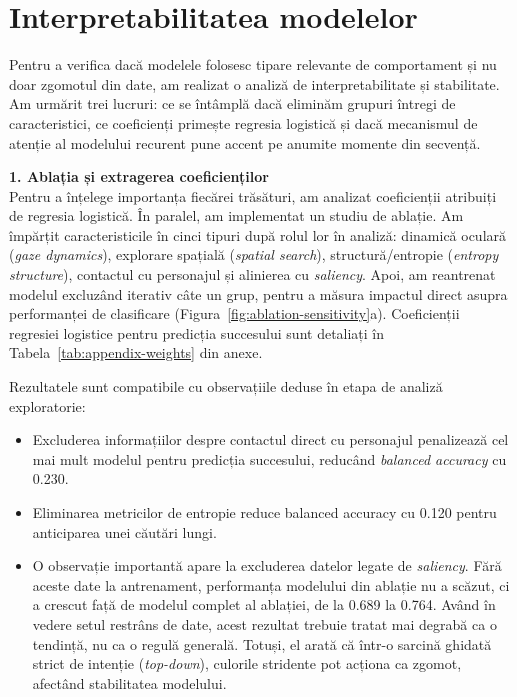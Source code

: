 \section{Interpretabilitatea modelelor}

Pentru a verifica dacă modelele folosesc tipare relevante de comportament și nu doar zgomotul din date, am realizat o analiză de interpretabilitate și stabilitate. Am urmărit trei lucruri: ce se întâmplă dacă eliminăm grupuri întregi de caracteristici, ce coeficienți primește regresia logistică și dacă mecanismul de atenție al modelului recurent pune accent pe anumite momente din secvență.

\textbf{1. Ablația și extragerea coeficienților} \\
Pentru a înțelege importanța fiecărei trăsături, am analizat coeficienții atribuiți de regresia logistică. În paralel, am implementat un studiu de ablație. Am împărțit caracteristicile în cinci tipuri după rolul lor în analiză: dinamică oculară (\emph{gaze dynamics}), explorare spațială (\emph{spatial search}), structură/entropie (\emph{entropy structure}), contactul cu personajul și alinierea cu \emph{saliency}. Apoi, am reantrenat modelul excluzând iterativ câte un grup, pentru a măsura impactul direct asupra performanței de clasificare (Figura~\ref{fig:ablation-sensitivity}a). Coeficienții regresiei logistice pentru predicția succesului sunt detaliați în Tabela~\ref{tab:appendix-weights} din anexe.

Rezultatele sunt compatibile cu observațiile deduse în etapa de analiză exploratorie:
\begin{itemize}
	\item Excluderea informațiilor despre contactul direct cu personajul penalizează cel mai mult modelul pentru predicția succesului, reducând \emph{balanced accuracy} cu 0.230.
	\item Eliminarea metricilor de entropie reduce balanced accuracy cu 0.120 pentru anticiparea unei căutări lungi.
	\item O observație importantă apare la excluderea datelor legate de \emph{saliency}. Fără aceste date la antrenament, performanța modelului din ablație nu a scăzut, ci a crescut față de modelul complet al ablației, de la 0.689 la 0.764. Având în vedere setul restrâns de date, acest rezultat trebuie tratat mai degrabă ca o tendință, nu ca o regulă generală. Totuși, el arată că într-o sarcină ghidată strict de intenție (\emph{top-down}), culorile stridente pot acționa ca zgomot, afectând stabilitatea modelului.
\end{itemize}

